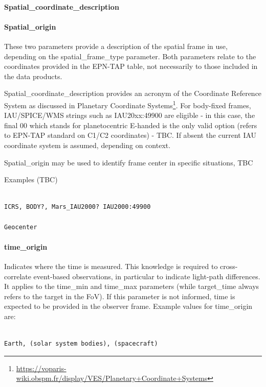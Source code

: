\documentclass[11pt,a4paper]{ivoa}
\begin{document}
\paragraph{Spatial\_coordinate\_description}

\paragraph{Spatial\_origin}

These two parameters provide a description of the spatial frame in use, depending on the spatial\_frame\_type parameter. Both parameters relate to the coordinates provided in the EPN-TAP table, not necessarily to those included in the data products. 

Spatial\_coordinate\_description provides an acronym of the Coordinate Reference System as discussed in Planetary Coordinate Systems\footnote{\url{https://voparis-wiki.obspm.fr/display/VES/Planetary+Coordinate+Systems}}. For body-fixed frames, IAU/SPICE/WMS strings such as IAU20xx:49900 are eligible - in this case, the final 00 which stands for planetocentric E-handed is the only valid option (refers to EPN-TAP standard on C1/C2 coordinates) - TBC. If absent the current IAU coordinate system is assumed, depending on context. 

Spatial\_origin may be used to identify frame center in specific situations, TBC

Examples (TBC)

\begin{verbatim}

ICRS, BODY?, Mars_IAU2000? IAU2000:49900

Geocenter

\end{verbatim}

\paragraph{time\_origin}

Indicates where the time is measured. This knowledge is required to cross-correlate event-based observations, in particular to indicate light-path differences. It applies to the time\_min and time\_max parameters (while target\_time always refers to the target in the FoV). If this parameter is not informed, time is expected to be provided in the observer frame. Example values for time\_origin are:

\begin{verbatim}

Earth, (solar system bodies), (spacecraft)

\end{verbatim}
\end{document}
